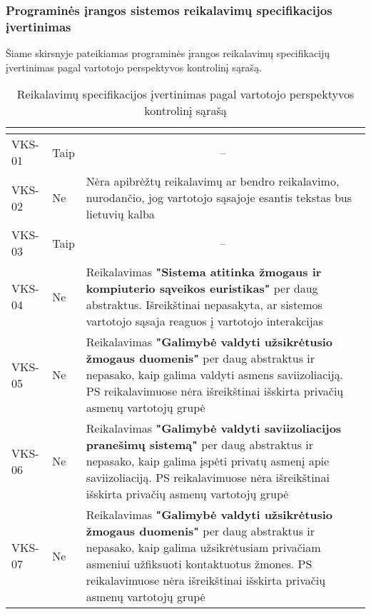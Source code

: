 \documentclass{VUMIFPSkursinis}
\begin{document}
\subsubsection{Programinės įrangos sistemos reikalavimų specifikacijos įvertinimas}
Šiame skirsnyje pateikiamas programinės įrangos reikalavimų specifikacijų įvertinimas pagal vartotojo perspektyvos kontrolinį sąrašą.
			\begin{center}

\begin{longtable}{|C{2cm}|L{2.5cm}|L{10cm}|}

					\caption{Reikalavimų specifikacijos įvertinimas pagal vartotojo perspektyvos kontrolinį sąrašą}
					\label{table:VKS}

 					\\ \hline
 					 &
  					 & 
 					\\ \hline
 					VKS-01 &
 					Taip& 
 					\\ \hline
 					VKS-02 &
 					Ne&
 					Nėra apibrėžtų reikalavimų ar bendro reikalavimo, nurodančio, jog vartotojo sąsajoje esantis tekstas bus lietuvių kalba\\ \hline
 					VKS-03 &
 					Taip & 
					\\ \hline  
 					VKS-04 &
 					Ne& 
 					Reikalavimas \textbf{"Sistema atitinka žmogaus ir kompiuterio sąveikos euristikas"} per daug abstraktus. Išreikštinai nepasakyta, ar sistemos vartotojo sąsaja reaguos į vartotojo interakcijas \\ \hline    
 					VKS-05 &
 					Ne& 
 					Reikalavimas \textbf{"Galimybė valdyti užsikrėtusio žmogaus duomenis"} per daug abstraktus ir nepasako, kaip galima valdyti asmens saviizoliaciją. PS reikalavimuose nėra išreikštinai išskirta privačių asmenų vartotojų grupė\\ \hline  
 					VKS-06 &
 					Ne&
 					Reikalavimas \textbf{"Galimybė valdyti saviizoliacijos pranešimų sistemą"} per daug abstraktus ir nepasako, kaip galima įspėti privatų asmenį apie saviizoliaciją. PS reikalavimuose nėra išreikštinai išskirta privačių asmenų vartotojų grupė\\ \hline   					
 					VKS-07 &
 					Ne&
 					Reikalavimas \textbf{"Galimybė valdyti užsikrėtusio žmogaus duomenis"} per daug abstraktus ir nepasako, kaip galima užsikrėtusiam privačiam asmeniui užfiksuoti kontaktuotus žmones. PS reikalavimuose nėra išreikštinai išskirta privačių asmenų vartotojų grupė\\ \hline  

\end{longtable}
\end{center}
\end{document}
